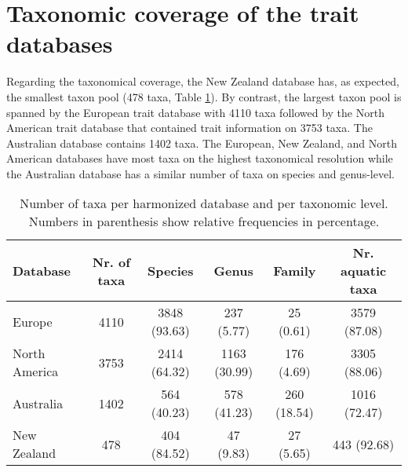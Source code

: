 \documentclass[../Draft_harmonization_paper.tex]{subfiles}
\begin{document}
\section{Taxonomic coverage of the trait databases}

Regarding the taxonomical coverage, the New Zealand database has, as expected, the smallest taxon pool (478 taxa, Table \ref{tab:tax_coverage}). By contrast, the largest taxon pool is spanned by the European trait database with 4110 taxa followed by the North American trait database that contained trait information on 3753 taxa. The Australian database contains 1402 taxa. The European, New Zealand, and North American databases have most taxa on the highest taxonomical resolution while the Australian database has a similar number of taxa on species and genus-level.


\begin{table}[ht]
    \centering
    \caption{Number of taxa per harmonized database and per taxonomic level. Numbers in parenthesis show relative frequencies in percentage.}
    \label{tab:tax_coverage}
    \begin{tabular}{lccccc}
    \hline
    Database & Nr. of taxa & Species & Genus & Family & Nr. aquatic taxa \\ 
    \hline
    Europe & 4110 & 3848 (93.63) & 237 (5.77) & 25 (0.61) & 3579 (87.08) \\ 
      North America & 3753 & 2414 (64.32) & 1163 (30.99) & 176 (4.69) & 3305 (88.06) \\ 
      Australia & 1402 & 564 (40.23) & 578 (41.23) & 260 (18.54) & 1016 (72.47) \\ 
      New Zealand & 478 & 404 (84.52) & 47 (9.83) & 27 (5.65) & 443 (92.68) \\ 
    \hline
    \end{tabular}
\end{table}
\end{document}
